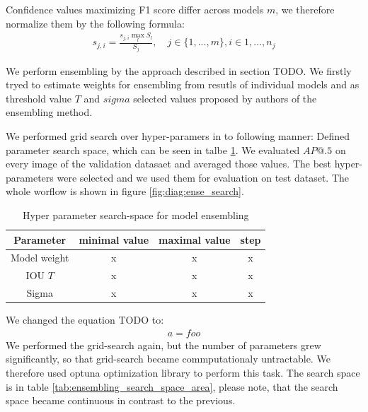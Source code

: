 Confidence values maximizing F1 score differ across models $m$, we therefore normalize them by the following formula:
\begin{align}
    s_{j,i} = \frac{s_{j,i} \max_l S_l}{  S_j}, \quad j \in \{ 1,...,m\}, i \in {1,...,n_j}
\end{align}

We perform ensembling by the approach described in section TODO. We firstly tryed to estimate weights for ensembling from resutls of individual models and as threshold value $T$ and $sigma$ selected values proposed by authors of the ensembling method.

We performed grid search over hyper-paramers in to following manner: Defined parameter search space, which can be seen in talbe \ref{tab:ensembling_search_space}. We evaluated $AP@.5$ on every image of the validation datasaet and averaged those values. The best hyper-parameters were selected and we used them for evaluation on test dataset. The whole worflow is shown in figure \ref{fig:diag:ense_search}.

\begin{table}
    \centering
    \begin{tabular}{|c|c|c|c|}
        Parameter    & minimal value & maximal value & step \\ \hline
        Model weight & x             & x             & x    \\ \hline
        IOU $T$      & x             & x             & x    \\ \hline
        Sigma        & x             & x             & x    \\ \hline
    \end{tabular}
    \caption{Hyper parameter search-space for model ensembling}
    \label{tab:ensembling_search_space}
\end{table}

We changed the equation TODO to:
\begin{align}
    a = foo
\end{align}
We performed the grid-search again, but the number of parameters grew significantly, so that grid-search became commputationaly untractable. We therefore used optuna optimization library to perform this task. The search space is in table \ref{tab:ensembling_search_space_area}, please note, that the search space became continuous in contrast to the previous.

